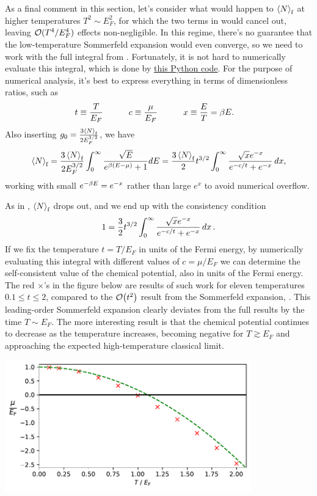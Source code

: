 As a final comment in this section, let's consider what would happen to $\left\langle N \right\rangle_{\text{f}}$ at higher temperatures $T^2 \sim E_F^2$, for which the two terms in  would cancel out, leaving $\mathcal O(T^4 / E_F^4)$ effects non-negligible.
In this regime, there's no guarantee that the low-temperature Sommerfeld expansion would even converge, so we need to work with the full integral from .
Fortunately, it is not hard to numerically evaluate this integral, which is done by \href{https://github.com/daschaich/MATH327_2025/blob/main/lecture_notes/unit08_fermi-gas.py}{this Python code}.
For the purpose of numerical analysis, it's best to express everything in terms of dimensionless ratios, such as
\begin{align*}
  t & \equiv \frac{T}{E_F} \qquad &
  c & \equiv \frac{\mu}{E_F} \qquad &
  x & \equiv \frac{E}{T} = \beta E.
\end{align*}
Also inserting $g_0 = \frac{3\left\langle N \right\rangle_{\text{f}}}{2E_F^{3 / 2}}$, we have
\begin{equation*}
  \left\langle N \right\rangle_{\text{f}} = \frac{3\left\langle N \right\rangle_{\text{f}}}{2E_F^{3 / 2}} \int_0^{\infty} \frac{\sqrt{E}}{e^{\beta(E - \mu)} + 1} dE = \frac{3\left\langle N \right\rangle_{\text{f}}}{2} t^{3 / 2} \int_0^{\infty} \frac{\sqrt{x} e^{-x}}{e^{-c / t} + e^{-x}} \mathop{dx},
\end{equation*}
working with small $e^{-\beta E} = e^{-x}$ rather than large $e^x$ to avoid numerical overflow.

As in , $\left\langle N \right\rangle_{\text{f}}$ drops out, and we end up with the consistency condition
\begin{equation}
  1 = \frac{3}{2} t^{3 / 2} \int_0^{\infty} \frac{\sqrt{x} e^{-x}}{e^{-c / t} + e^{-x}} \mathop{dx}.
\end{equation}
If we fix the temperature $t = T / E_F$ in units of the Fermi energy, by numerically evaluating this integral with different values of $c = \mu / E_F$ we can determine the self-consistent value of the chemical potential, also in units of the Fermi energy.
The red $\times$'s in the figure below are results of such work for eleven temperatures $0.1 \leq t \leq 2$, compared to the $\mathcal O\!\left(t^2\right)$ result from the Sommerfeld expansion, .
This leading-order Sommerfeld expansion clearly deviates from the full results by the time $T \sim E_F$.
The more interesting result is that the chemical potential continues to decrease as the temperature increases, becoming negative for $T \gtrsim E_F$ and approaching the expected high-temperature classical limit.

\begin{center}\includegraphics[width=0.8\textwidth]{figs/unit08_fermi-gas.pdf}\end{center}
